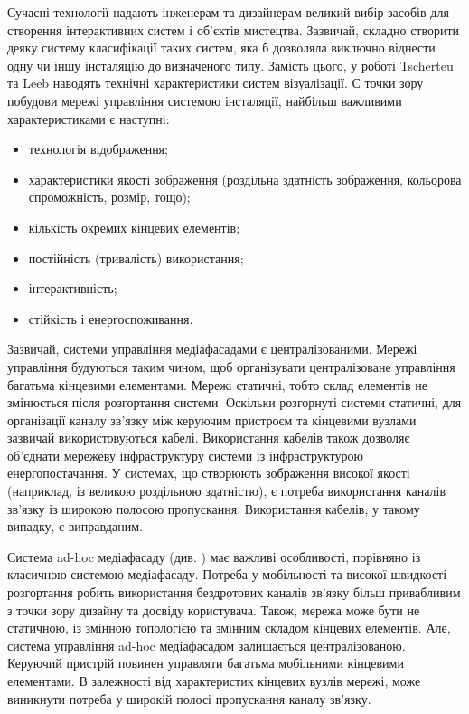 \documentclass[a4paper,ukrainian,utf8,nocolumnsxix,floatsection,equationsection]{eskdtext}
\begin{document}
Сучасні технології надають інженерам та дизайнерам великий вибір засобів для створення інтерактивних систем і об'єктів мистецтва. Зазвичай, складно створити деяку систему класифікації таких систем, яка б дозволяла виключно віднести одну чи іншу інсталяцію до визначеного типу. Замість цього, у роботі \cite{media:facades:fundamentals} Tscherteu та Leeb наводять технічні характеристики систем візуалізації. С точки зору побудови мережі управління системою інсталяції, найбільш важливими характеристиками є наступні:

\begin{itemize}
	\item технологія відображення;
	\item характеристики якості зображення (роздільна здатність зображення, кольорова спроможність, розмір, тощо);
	\item кількість окремих кінцевих елементів;
	\item постійність (тривалість) використання;
	\item інтерактивність;
	\item стійкість і енергоспоживання.
\end{itemize}

Зазвичай, системи управління медіафасадами є централізованими. Мережі управління будуються таким чином, щоб організувати централізоване управління багатьма кінцевими елементами. Мережі статичні, тобто склад елементів не змінюється після розгортання системи. Оскільки розгорнуті системи статичні, для організації каналу зв'язку між керуючим пристроєм та кінцевими вузлами зазвичай використовуються кабелі. Використання кабелів також дозволяє об'єднати мережеву інфраструктуру системи із інфраструктурою енергопостачання. У системах, що створюють зображення високої якості (наприклад, із великою роздільною здатністю), є потреба використання каналів зв'язку із широкою полосою пропускання. Використання кабелів, у такому випадку, є виправданим.

Система ad-hoc медіафасаду (див. \cite{idaacs:2013:adhoc:media:facade}) має важливі особливості, порівняно із класичною системою медіафасаду. Потреба у мобільності та високої швидкості розгортання робить використання бездротових каналів зв'язку більш привабливим з точки зору дизайну та досвіду користувача. Також, мережа може бути не статичною, із змінною топологією та змінним складом кінцевих елементів. Але, система управління ad-hoc медіафасадом залишається централізованою. Керуючий пристрій повинен управляти багатьма мобільними кінцевими елементами. В залежності від характеристик кінцевих вузлів мережі, може виникнути потреба у широкій полосі пропускання каналу зв'язку. 
\end{document}
